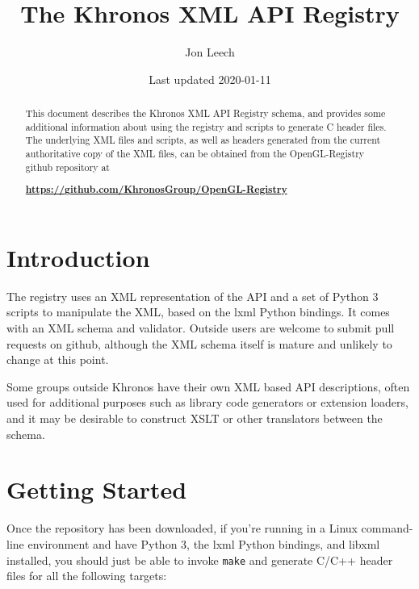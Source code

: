 \documentclass{article}
\def\code#1{{\tt #1}}
\begin{document}
\title{The Khronos XML API Registry}
\author{Jon Leech}
\date{Last updated 2020-01-11}
\maketitle

\begin{abstract}

This document describes the Khronos XML API Registry schema, and provides
some additional information about using the registry and scripts to generate
C header files. The underlying XML files and scripts, as well as headers
generated from the current authoritative copy of the XML files, can be
obtained from the OpenGL-Registry github repository at

\begin{center}
{\bf \href{https://github.com/KhronosGroup/OpenGL-Registry}
          {https://github.com/KhronosGroup/OpenGL-Registry}}
\end{center}

\end{abstract}

\tableofcontents

\section{Introduction}

The registry uses an XML representation of the API and a set of Python 3
scripts to manipulate the XML, based on the lxml Python bindings. It comes
with an XML schema and validator. Outside users are welcome to submit pull
requests on github, although the XML schema itself is mature and unlikely to
change at this point.

Some groups outside Khronos have their own XML based API descriptions,
often used for additional purposes such as library code generators or
extension loaders, and it may be desirable to construct XSLT or other
translators between the schema.


\section{Getting Started}

Once the repository has been downloaded, if you're running
in a Linux command-line environment and have Python 3, the lxml Python
bindings, and libxml installed, you should just be able to invoke
\code{make} and generate C/C++ header files for all the following
targets:
\end{document}
